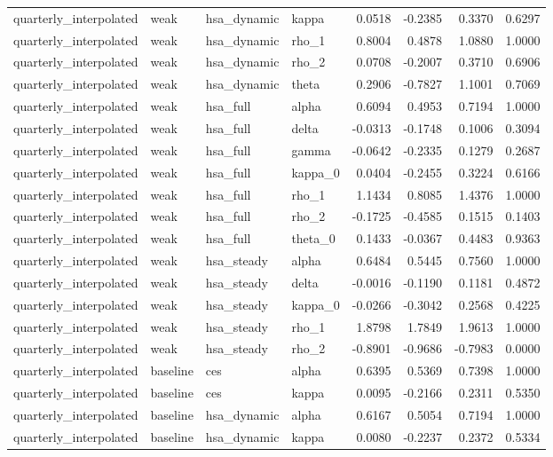 \begin{tabular}{llllrrrr}
quarterly\_interpolated & weak & hsa\_dynamic & kappa & 0.0518 & -0.2385 & 0.3370 & 0.6297 \\
quarterly\_interpolated & weak & hsa\_dynamic & rho\_1 & 0.8004 & 0.4878 & 1.0880 & 1.0000 \\
quarterly\_interpolated & weak & hsa\_dynamic & rho\_2 & 0.0708 & -0.2007 & 0.3710 & 0.6906 \\
quarterly\_interpolated & weak & hsa\_dynamic & theta & 0.2906 & -0.7827 & 1.1001 & 0.7069 \\
quarterly\_interpolated & weak & hsa\_full & alpha & 0.6094 & 0.4953 & 0.7194 & 1.0000 \\
quarterly\_interpolated & weak & hsa\_full & delta & -0.0313 & -0.1748 & 0.1006 & 0.3094 \\
quarterly\_interpolated & weak & hsa\_full & gamma & -0.0642 & -0.2335 & 0.1279 & 0.2687 \\
quarterly\_interpolated & weak & hsa\_full & kappa\_0 & 0.0404 & -0.2455 & 0.3224 & 0.6166 \\
quarterly\_interpolated & weak & hsa\_full & rho\_1 & 1.1434 & 0.8085 & 1.4376 & 1.0000 \\
quarterly\_interpolated & weak & hsa\_full & rho\_2 & -0.1725 & -0.4585 & 0.1515 & 0.1403 \\
quarterly\_interpolated & weak & hsa\_full & theta\_0 & 0.1433 & -0.0367 & 0.4483 & 0.9363 \\
quarterly\_interpolated & weak & hsa\_steady & alpha & 0.6484 & 0.5445 & 0.7560 & 1.0000 \\
quarterly\_interpolated & weak & hsa\_steady & delta & -0.0016 & -0.1190 & 0.1181 & 0.4872 \\
quarterly\_interpolated & weak & hsa\_steady & kappa\_0 & -0.0266 & -0.3042 & 0.2568 & 0.4225 \\
quarterly\_interpolated & weak & hsa\_steady & rho\_1 & 1.8798 & 1.7849 & 1.9613 & 1.0000 \\
quarterly\_interpolated & weak & hsa\_steady & rho\_2 & -0.8901 & -0.9686 & -0.7983 & 0.0000 \\
quarterly\_interpolated & baseline & ces & alpha & 0.6395 & 0.5369 & 0.7398 & 1.0000 \\
quarterly\_interpolated & baseline & ces & kappa & 0.0095 & -0.2166 & 0.2311 & 0.5350 \\
quarterly\_interpolated & baseline & hsa\_dynamic & alpha & 0.6167 & 0.5054 & 0.7194 & 1.0000 \\
quarterly\_interpolated & baseline & hsa\_dynamic & kappa & 0.0080 & -0.2237 & 0.2372 & 0.5334 \\

\end{tabular}
